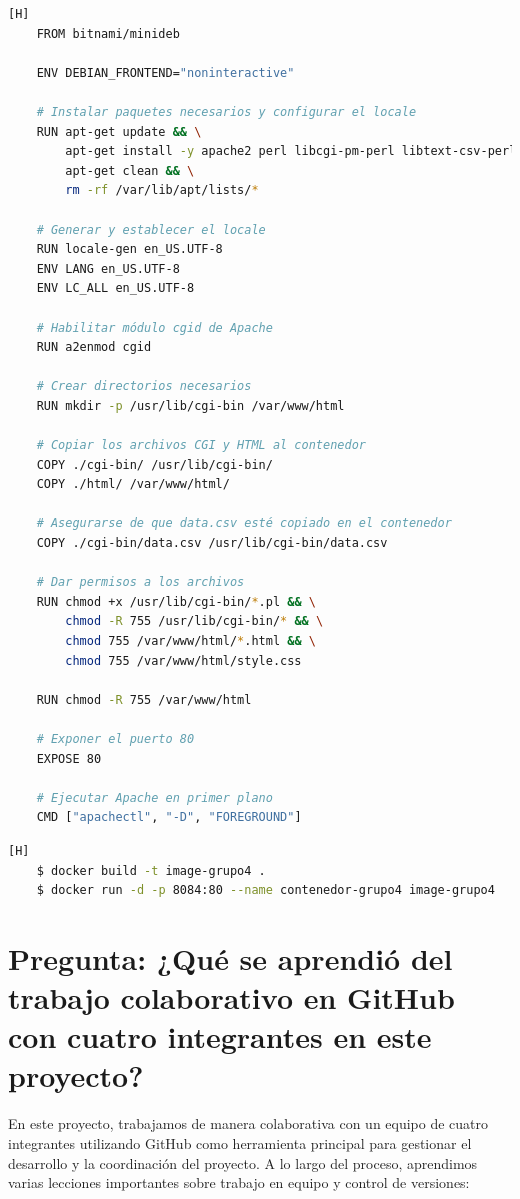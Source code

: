 \documentclass{article}
\begin{document}
    \begin{lstlisting}[language=bash,caption={Dockerfile para el despliegue}][H]
    FROM bitnami/minideb
    
    ENV DEBIAN_FRONTEND="noninteractive"
    
    # Instalar paquetes necesarios y configurar el locale
    RUN apt-get update && \
        apt-get install -y apache2 perl libcgi-pm-perl libtext-csv-perl locales && \
        apt-get clean && \
        rm -rf /var/lib/apt/lists/*
    
    # Generar y establecer el locale
    RUN locale-gen en_US.UTF-8
    ENV LANG en_US.UTF-8
    ENV LC_ALL en_US.UTF-8
    
    # Habilitar módulo cgid de Apache
    RUN a2enmod cgid
    
    # Crear directorios necesarios
    RUN mkdir -p /usr/lib/cgi-bin /var/www/html
    
    # Copiar los archivos CGI y HTML al contenedor
    COPY ./cgi-bin/ /usr/lib/cgi-bin/
    COPY ./html/ /var/www/html/
    
    # Asegurarse de que data.csv esté copiado en el contenedor
    COPY ./cgi-bin/data.csv /usr/lib/cgi-bin/data.csv
    
    # Dar permisos a los archivos
    RUN chmod +x /usr/lib/cgi-bin/*.pl && \
        chmod -R 755 /usr/lib/cgi-bin/* && \
        chmod 755 /var/www/html/*.html && \
        chmod 755 /var/www/html/style.css
    
    RUN chmod -R 755 /var/www/html
    
    # Exponer el puerto 80
    EXPOSE 80
    
    # Ejecutar Apache en primer plano
    CMD ["apachectl", "-D", "FOREGROUND"]
    \end{lstlisting}
    
    \begin{lstlisting}[language=bash,caption={Commit: Comandos para despliegue}][H]
    $ docker build -t image-grupo4 .
    $ docker run -d -p 8084:80 --name contenedor-grupo4 image-grupo4
    \end{lstlisting}
    

    \section{Pregunta: ¿Qué se aprendió del trabajo colaborativo en GitHub con cuatro integrantes en este proyecto?}
    
    En este proyecto, trabajamos de manera colaborativa con un equipo de cuatro integrantes utilizando GitHub como herramienta principal para gestionar el desarrollo y la coordinación del proyecto. A lo largo del proceso, aprendimos varias lecciones importantes sobre trabajo en equipo y control de versiones:
    
\end{document}
